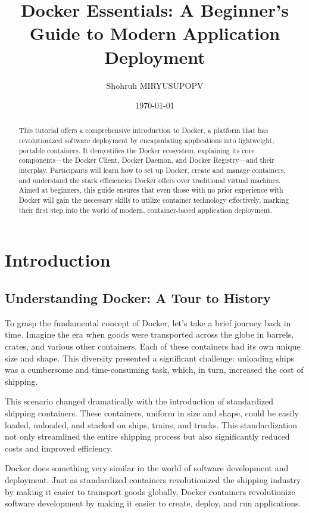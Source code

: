 \documentclass{article}
\begin{document}
\title{Docker Essentials: A Beginner's Guide to Modern Application Deployment}
\author{Shohruh MIRYUSUPOPV}
\date{\today}
\maketitle

\begin{abstract}
This tutorial offers a comprehensive introduction to Docker, a platform that has revolutionized software deployment by encapsulating applications into lightweight, portable containers. It demystifies the Docker ecosystem, explaining its core components—the Docker Client, Docker Daemon, and Docker Registry—and their interplay. Participants will learn how to set up Docker, create and manage containers, and understand the stark efficiencies Docker offers over traditional virtual machines. Aimed at beginners, this guide ensures that even those with no prior experience with Docker will gain the necessary skills to utilize container technology effectively, marking their first step into the world of modern, container-based application deployment.
\end{abstract}

\tableofcontents

\newpage
\section{Introduction}
\subsection{Understanding Docker: A Tour to History}

To grasp the fundamental concept of Docker, let's take a brief journey back in time. Imagine the era when goods were transported across the globe in barrels, crates, and various other containers. Each of these containers had its own unique size and shape. This diversity presented a significant challenge: unloading ships was a cumbersome and time-consuming task, which, in turn, increased the cost of shipping.

This scenario changed dramatically with the introduction of standardized shipping containers. These containers, uniform in size and shape, could be easily loaded, unloaded, and stacked on ships, trains, and trucks. This standardization not only streamlined the entire shipping process but also significantly reduced costs and improved efficiency.

Docker does something very similar in the world of software development and deployment. Just as standardized containers revolutionized the shipping industry by making it easier to transport goods globally, Docker containers revolutionize software development by making it easier to create, deploy, and run applications.
\end{document}
